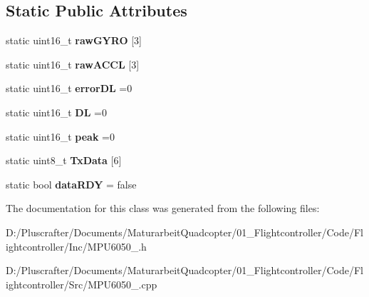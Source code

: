 \subsection*{Static Public Attributes}
\begin{DoxyCompactItemize}
\item 
\mbox{\label{class_sensors_1_1_m_p_u6050_a9e1b7e7fae58eda13a4a01dace4dce31}} 
static uint16\+\_\+t {\bfseries raw\+G\+Y\+RO} \mbox{[}3\mbox{]}
\item 
\mbox{\label{class_sensors_1_1_m_p_u6050_ac65f4884966872a95ed292a86419be41}} 
static uint16\+\_\+t {\bfseries raw\+A\+C\+CL} \mbox{[}3\mbox{]}
\item 
\mbox{\label{class_sensors_1_1_m_p_u6050_a23ca89d6631e30ffe5bc70196f991bba}} 
static uint16\+\_\+t {\bfseries error\+DL} =0
\item 
\mbox{\label{class_sensors_1_1_m_p_u6050_a0a14bd353bb0ef0828c8a97a31759c9f}} 
static uint16\+\_\+t {\bfseries DL} =0
\item 
\mbox{\label{class_sensors_1_1_m_p_u6050_ad3fcb168d63e452bfa871672a10ea27b}} 
static uint16\+\_\+t {\bfseries peak} =0
\item 
\mbox{\label{class_sensors_1_1_m_p_u6050_a0824a5a6c37256c078dd861fbe5678f6}} 
static uint8\+\_\+t {\bfseries Tx\+Data} \mbox{[}6\mbox{]}
\item 
\mbox{\label{class_sensors_1_1_m_p_u6050_a8f379aeb0bbbc448d9393419ac489e94}} 
static bool {\bfseries data\+R\+DY} = false
\end{DoxyCompactItemize}


The documentation for this class was generated from the following files\+:\begin{DoxyCompactItemize}
\item 
D\+:/\+Pluscrafter/\+Documents/\+Maturarbeit\+Quadcopter/01\+\_\+\+Flightcontroller/\+Code/\+Flightcontroller/\+Inc/M\+P\+U6050\+\_\+.\+h\item 
D\+:/\+Pluscrafter/\+Documents/\+Maturarbeit\+Quadcopter/01\+\_\+\+Flightcontroller/\+Code/\+Flightcontroller/\+Src/M\+P\+U6050\+\_\+.\+cpp\end{DoxyCompactItemize}
